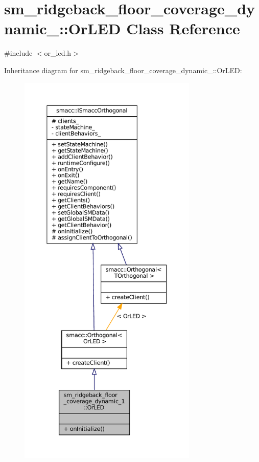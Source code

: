 \hypertarget{classsm__ridgeback__floor__coverage__dynamic__1_1_1OrLED}{}\section{sm\+\_\+ridgeback\+\_\+floor\+\_\+coverage\+\_\+dynamic\+\_\+:\+:Or\+L\+ED Class Reference}
\label{classsm__ridgeback__floor__coverage__dynamic__1_1_1OrLED}


{\ttfamily \#include $<$or\+\_\+led.\+h$>$}



Inheritance diagram for sm\+\_\+ridgeback\+\_\+floor\+\_\+coverage\+\_\+dynamic\+\_\+:\+:Or\+L\+ED\+:
\nopagebreak
\begin{figure}[H]
\begin{center}
\leavevmode
\includegraphics[height=550pt]{classsm__ridgeback__floor__coverage__dynamic__1_1_1OrLED__inherit__graph}
\end{center}
\end{figure}


